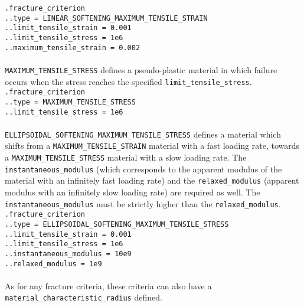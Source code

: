 \documentclass[10pt]{article}
\begin{document}
\noindent \verb+.fracture_criterion+\\
\verb+..type = LINEAR_SOFTENING_MAXIMUM_TENSILE_STRAIN+\\
\verb+..limit_tensile_strain = 0.001+\\
\verb+..limit_tensile_stress = 1e6+\\
\verb+..maximum_tensile_strain = 0.002+

\paragraph{} \verb+MAXIMUM_TENSILE_STRESS+ defines a pseudo-plastic material in which failure occurs when the stress reaches the specified \verb+limit_tensile_stress+.\\

\noindent \verb+.fracture_criterion+\\
\verb+..type = MAXIMUM_TENSILE_STRESS+\\
\verb+..limit_tensile_stress = 1e6+

\paragraph{} \verb+ELLIPSOIDAL_SOFTENING_MAXIMUM_TENSILE_STRESS+ defines a material which shifts from a \verb+MAXIMUM_TENSILE_STRAIN+ material with a fast loading rate, towards a \verb+MAXIMUM_TENSILE_STRESS+ material with a slow loading rate. The \verb+instantaneous_modulus+ (which corresponds to the apparent modulus of the material with an infinitely fast loading rate) and the \verb+relaxed_modulus+ (apparent modulus with an infinitely slow loading rate) are required as well. The \verb+instantaneous_modulus+ must be strictly higher than the \verb+relaxed_modulus+.\\

\noindent \verb+.fracture_criterion+\\
\verb+..type = ELLIPSOIDAL_SOFTENING_MAXIMUM_TENSILE_STRESS+\\
\verb+..limit_tensile_strain = 0.001+\\
\verb+..limit_tensile_stress = 1e6+\\
\verb+..instantaneous_modulus = 10e9+\\
\verb+..relaxed_modulus = 1e9+\\

\paragraph{} As for any fracture criteria, these criteria can also have a \verb+material_characteristic_radius+ defined.
\end{document}
